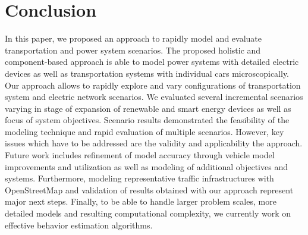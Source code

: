 \section{Conclusion}
\label{section:conclusion}

In this paper, we proposed an approach to rapidly model and evaluate transportation and power system scenarios. 
The proposed holistic and component-based approach is able to model power systems with detailed electric devices as well as transportation systems with individual cars microscopically. Our approach allows to rapidly explore and vary configurations of transportation system and electric network scenarios. We evaluated several incremental scenarios varying in stage of expansion of renewable and smart energy devices as well as focus of system objectives. 
Scenario results demonstrated the feasibility of the modeling technique and rapid evaluation of multiple scenarios. However, key issues which have to be addressed are the validity and applicability the approach.
Future work includes refinement of model accuracy through vehicle model improvements and utilization as well as modeling of additional objectives and systems. Furthermore, modeling representative traffic infrastructures with OpenStreetMap and validation of results obtained with our approach represent major next steps. Finally, to be able to handle larger problem scales, more detailed models and resulting computational complexity, we currently work on effective behavior estimation algorithms.
